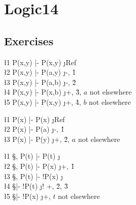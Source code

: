 \documentclass[class=cs245,notes,leqno]{agony}
\begin{document}
\chapter{Logic14}

\section{Exercises}

\begin{xca}
\end{xca}
\begin{prf}
  \begin{deduce}
    \l1 \A[x]\A[y] P(x,y) |- \A[x]\A[y] P(x,y) \j {Ref}                          \\
    \l2 \A[x]\A[y] P(x,y) |- \A[y] P(a,y)      \j {\A -, \r1}                    \\
    \l3 \A[x]\A[y] P(x,y) |- P(a,b)            \j {\A -, \r2}                    \\
    \l4 \A[x]\A[y] P(x,y) |- \A[x] P(x,b)      \j {\A +, \r3, $a$ not elsewhere} \\
    \l5 \A[x]\A[y] P(x,y) |- \A[y] P(x,y)      \j {\A +, \r4, $b$ not elsewhere}
  \end{deduce}
\end{prf}

\begin{xca}
\end{xca}
\begin{prf}
  \begin{deduce}
    \l1 \A[x] P(x) |- \A[x] P(x) \j {Ref}                          \\
    \l2 \A[x] P(x) |- P(a)       \j {\A -, \r1}                    \\
    \l3 \A[x] P(x) |- \A[y] P(y) \j {\A +, \r2, $a$ not elsewhere}
  \end{deduce}
\end{prf}

\begin{xca}
\end{xca}
\begin{prf}
  \begin{deduce}
    \l1 \S, P(t) |- P(t)       \j {\E}                      \\
    \l2 \S, P(t) |- \X[x]P(x)  \j {\X +, \r1}               \\
    \l3 \S, P(t) |- !\X[x]P(x) \j {\E}                      \\
    \l4 \S       |- !P(t)      \j {! +, \r2, \r3}           \\
    \l5 \S       |- \A[x]!P(x) \j {\A +, $t$ not elsewhere}
  \end{deduce}
\end{prf}
\end{document}
